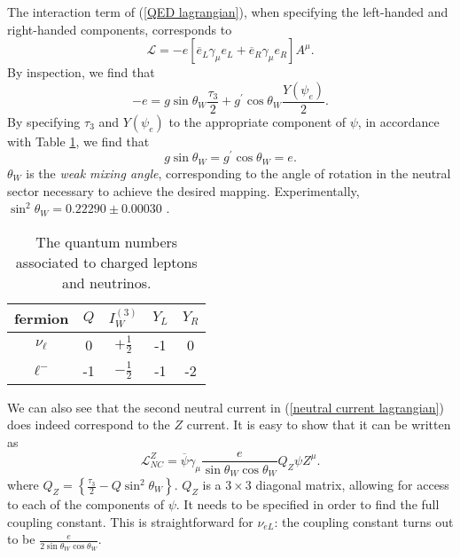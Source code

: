 \documentclass[10pt,a4paper]{book}
\begin{document}
The interaction term of (\ref{QED lagrangian}), when specifying the left-handed and right-handed components, corresponds to
\begin{equation}
\mathcal{L} = -e\left[ \overline{e}_L\gamma_\mu e_L + \overline{e}_R\gamma_\mu e_R
\right]A^\mu.
\end{equation} 
By inspection, we find that
\begin{equation}
-e = g\sin\theta_W \frac{\tau_3}{2} + g^\prime \cos\theta_W \frac{Y(\psi_{e})}{2}.
\end{equation}
By specifying $\tau_3$ and $Y(\psi_e)$ to the appropriate component of $\psi$, in accordance with Table \ref{quantum numbers}, we find that
\begin{equation}
g\sin\theta_W = g^\prime \cos\theta_W = e.
\end{equation}
$\theta_W$ is the \emph{weak mixing angle}, corresponding to the angle of rotation in the neutral sector necessary to achieve the desired mapping. Experimentally, $\sin^2\theta_W = 0.22290 \pm 0.00030$ \cite{NIST}. 

\begin{table} 
\begin{center}
\begin{tabular}{ccccc}
\hline 
fermion & $Q$ & $I^{(3)}_W$ & $Y_L$ & $Y_R$ \\ 
\hline 
$\nu_\ell$ & 0 & $+\frac{1}{2}$ & -1 & 0 \\ 
$\ell^-$ & -1 & $-\frac{1}{2}$ & -1 & -2 \\ 
\hline
\end{tabular}
\caption{The quantum numbers associated to charged leptons and neutrinos.}
\label{quantum numbers}
\end{center}
\end{table}

We can also see that the second neutral current in (\ref{neutral current lagrangian}) does indeed correspond to the $Z$ current. It is easy to show that it can be written as
\begin{equation}
\label{NC - Z}
\mathcal{L}_{NC}^{Z} = \overline{\psi}\gamma_\mu \frac{e}{\sin\theta_W \cos\theta_W} Q_Z \psi Z^\mu.
\end{equation}
where $Q_Z = \left\lbrace \frac{\tau_3}{2} - Q\sin^2\theta_W \right\rbrace$. $Q_Z$ is a $3\times 3$ diagonal matrix, allowing for access to each of the components of $\psi$. It needs to be specified in order to find the full coupling constant. This is straightforward for $\nu_{eL}$: the coupling constant turns out to be $\frac{e}{2\sin\theta_W\cos\theta_W}$. 
\end{document}
